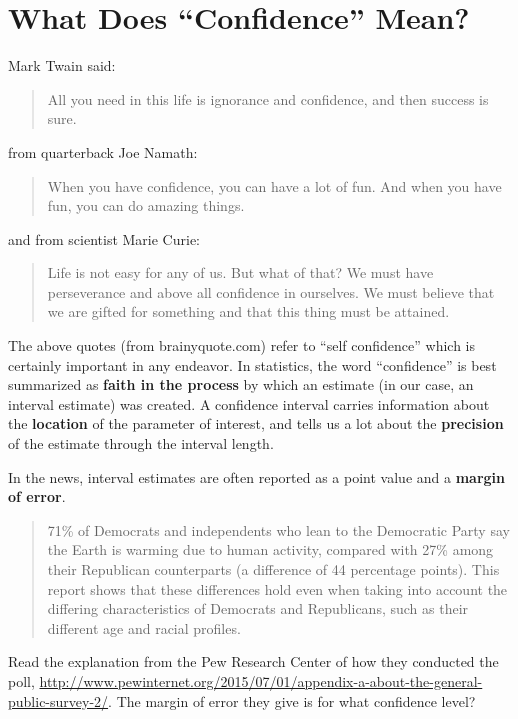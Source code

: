 \def\theTopic{Reading 6}

\section { What Does ``Confidence'' Mean?}

Mark Twain said:
\begin{quotation}
All you need in this life is ignorance and confidence, and then
success is sure.   
\end{quotation}

 from quarterback Joe Namath:
\begin{quotation}
When you have confidence, you can have a lot of fun. And when you have fun, you can do amazing things.  
\end{quotation}

and from scientist Marie Curie:
\begin{quotation}
  Life is not easy for any of us. But what of that? We must have
  perseverance and above all confidence in ourselves. We must believe
  that we are gifted for something and that this thing must be
  attained. 
\end{quotation}

The above quotes (from brainyquote.com) refer to  ``self confidence''
which is certainly important in any endeavor.
In statistics, the word ``confidence'' is best summarized as {\bf
  faith in the process} by which an estimate (in our case, an interval
estimate) was created.  A confidence interval carries information
about the {\bf location} of the parameter of interest, and tells us a lot
about the {\bf precision} of the estimate through the interval
length. 


In the news, interval estimates are often reported as a point value
and a {\bf margin of error}. 

\begin{quotation}
  71\% of Democrats and independents who lean to the Democratic Party
  say the Earth is warming due to human activity, compared with 27\%
  among their Republican counterparts (a difference of 44 percentage
  points). This report shows that these differences hold even when
  taking into account the differing characteristics of Democrats and
  Republicans, such as their different age and racial profiles. 
\end{quotation}

  Read the explanation from the  Pew Research Center  of how they
  conducted the poll,
\url{http://www.pewinternet.org/2015/07/01/appendix-a-about-the-general-public-survey-2/}.
 The margin of error they give is for what confidence level?
  \vfill

